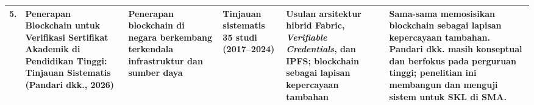 \begin{longtable}{|p{}|p{}|p{}|p{}|p{}|p{}|}
	\hline
	5. & Penerapan Blockchain untuk Verifikasi Sertifikat Akademik di Pendidikan Tinggi: Tinjauan Sistematis (Pandari dkk., 2026)~\cite{Pandari2026Blockchain} & Penerapan blockchain di negara berkembang terkendala infrastruktur dan sumber daya & Tinjauan sistematis 35 studi (2017--2024) & Usulan arsitektur hibrid Fabric, \textit{Verifiable Credentials}, dan IPFS; blockchain sebagai lapisan kepercayaan tambahan & Sama-sama memosisikan blockchain sebagai lapisan kepercayaan tambahan. Pandari dkk. masih konseptual dan berfokus pada perguruan tinggi; penelitian ini membangun dan menguji sistem untuk SKL di SMA.\\
	\hline
\end{longtable}
\endgroup

\begingroup
\setlength{\tabcolsep}{3pt}
\renewcommand{\arraystretch}{1.25}
\footnotesize

